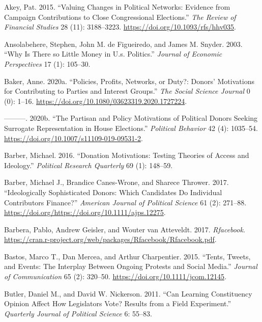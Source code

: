 \documentclass[12pt,]{article}
\begin{document}
\leavevmode\hypertarget{ref-akey2015}{}%
Akey, Pat. 2015. ``Valuing Changes in Political Networks: Evidence from
Campaign Contributions to Close Congressional Elections.'' \emph{The
Review of Financial Studies} 28 (11): 3188--3223.
\url{https://doi.org/10.1093/rfs/hhv035}.

\leavevmode\hypertarget{ref-ansolabehere2003}{}%
Ansolabehere, Stephen, John M. de Figueiredo, and James M. Snyder. 2003.
``Why Is There so Little Money in U.s. Politics.'' \emph{Journal of
Economic Perspectives} 17 (1): 105--30.

\leavevmode\hypertarget{ref-baker2020a}{}%
Baker, Anne. 2020a. ``Policies, Profits, Networks, or Duty?: Donors'
Motivations for Contributing to Parties and Interest Groups.'' \emph{The
Social Science Journal} 0 (0): 1--16.
\url{https://doi.org/10.1080/03623319.2020.1727224}.

\leavevmode\hypertarget{ref-baker2020b}{}%
---------. 2020b. ``The Partisan and Policy Motivations of Political
Donors Seeking Surrogate Representation in House Elections.''
\emph{Political Behavior} 42 (4): 1035--54.
\url{https://doi.org/10.1007/s11109-019-09531-2}.

\leavevmode\hypertarget{ref-barber2016a}{}%
Barber, Michael. 2016. ``Donation Motivations: Testing Theories of
Access and Ideology.'' \emph{Political Research Quarterly} 69 (1):
148--59.

\leavevmode\hypertarget{ref-barber2017}{}%
Barber, Michael J., Brandice Canes-Wrone, and Sharece Thrower. 2017.
``Ideologically Sophisticated Donors: Which Candidates Do Individual
Contributors Finance?'' \emph{American Journal of Political Science} 61
(2): 271--88. \url{https://doi.org/https://doi.org/10.1111/ajps.12275}.

\leavevmode\hypertarget{ref-rfacebook}{}%
Barbera, Pablo, Andrew Geisler, and Wouter van Atteveldt. 2017.
\emph{Rfacebook}.
\url{https://cran.r-project.org/web/packages/Rfacebook/Rfacebook.pdf}.

\leavevmode\hypertarget{ref-bastos2015}{}%
Bastos, Marco T., Dan Mercea, and Arthur Charpentier. 2015. ``Tents,
Tweets, and Events: The Interplay Between Ongoing Protests and Social
Media.'' \emph{Journal of Communication} 65 (2): 320--50.
\url{https://doi.org/10.1111/jcom.12145}.

\leavevmode\hypertarget{ref-butler2011}{}%
Butler, Daniel M., and David W. Nickerson. 2011. ``Can Learning
Constituency Opinion Affect How Legislators Vote? Results from a Field
Experiment.'' \emph{Quarterly Journal of Political Science} 6: 55--83.
\end{document}
